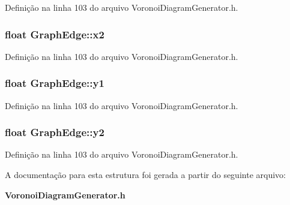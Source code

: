Definição na linha 103 do arquivo Voronoi\+Diagram\+Generator.\+h.

\subsubsection[{x2}]{\setlength{\rightskip}{0pt plus 5cm}float Graph\+Edge\+::x2}\label{struct_graph_edge_a4a308713c5af88b5f7528c04179ed950}


Definição na linha 103 do arquivo Voronoi\+Diagram\+Generator.\+h.

\subsubsection[{y1}]{\setlength{\rightskip}{0pt plus 5cm}float Graph\+Edge\+::y1}\label{struct_graph_edge_a8a98402e8c7afac249912f203546ca5b}


Definição na linha 103 do arquivo Voronoi\+Diagram\+Generator.\+h.

\subsubsection[{y2}]{\setlength{\rightskip}{0pt plus 5cm}float Graph\+Edge\+::y2}\label{struct_graph_edge_a674c0ecb63e7a88beba0a321f90f15dd}


Definição na linha 103 do arquivo Voronoi\+Diagram\+Generator.\+h.



A documentação para esta estrutura foi gerada a partir do seguinte arquivo\+:\begin{DoxyCompactItemize}
\item 
{\bf Voronoi\+Diagram\+Generator.\+h}\end{DoxyCompactItemize}
